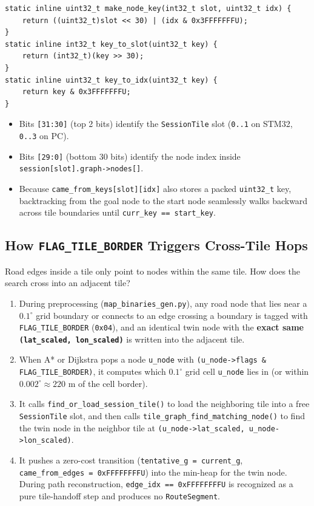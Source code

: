 \documentclass[11pt,a4paper]{article}
\begin{document}
\begin{lstlisting}[caption={32-bit packed node key in \texttt{pathfinder.c}}]
static inline uint32_t make_node_key(int32_t slot, uint32_t idx) {
    return ((uint32_t)slot << 30) | (idx & 0x3FFFFFFFU);
}
static inline int32_t key_to_slot(uint32_t key) {
    return (int32_t)(key >> 30);
}
static inline uint32_t key_to_idx(uint32_t key) {
    return key & 0x3FFFFFFFU;
}
\end{lstlisting}
\begin{itemize}
    \item Bits \texttt{[31:30]} (top 2 bits) identify the \texttt{SessionTile} slot (\texttt{0..1} on STM32, \texttt{0..3} on PC).
    \item Bits \texttt{[29:0]} (bottom 30 bits) identify the node index inside \texttt{session[slot].graph->nodes[]}.
    \item Because \texttt{came\_from\_keys[slot][idx]} also stores a packed \texttt{uint32\_t} key, backtracking from the goal node to the start node seamlessly walks backward across tile boundaries until \texttt{curr\_key == start\_key}.
\end{itemize}

\subsection{How \texttt{FLAG\_TILE\_BORDER} Triggers Cross-Tile Hops}

Road edges inside a tile only point to nodes within the same tile. How does the search cross into an adjacent tile?
\begin{enumerate}
    \item During preprocessing (\texttt{map\_binaries\_gen.py}), any road node that lies near a $0.1^\circ$ grid boundary or connects to an edge crossing a boundary is tagged with \texttt{FLAG\_TILE\_BORDER} (\texttt{0x04}), and an identical twin node with the \textbf{exact same \texttt{(lat\_scaled, lon\_scaled)}} is written into the adjacent tile.
    \item When A* or Dijkstra pops a node \texttt{u\_node} with \texttt{(u\_node->flags \& FLAG\_TILE\_BORDER)}, it computes which $0.1^\circ$ grid cell \texttt{u\_node} lies in (or within $0.002^\circ \approx 220\text{ m}$ of the cell border).
    \item It calls \texttt{find\_or\_load\_session\_tile()} to load the neighboring tile into a free \texttt{SessionTile} slot, and then calls \texttt{tile\_graph\_find\_matching\_node()} to find the twin node in the neighbor tile at \texttt{(u\_node->lat\_scaled, u\_node->lon\_scaled)}.
    \item It pushes a zero-cost transition (\texttt{tentative\_g = current\_g}, \texttt{came\_from\_edges = 0xFFFFFFFFU}) into the min-heap for the twin node. During path reconstruction, \texttt{edge\_idx == 0xFFFFFFFFU} is recognized as a pure tile-handoff step and produces no \texttt{RouteSegment}.
\end{enumerate}
\end{document}
